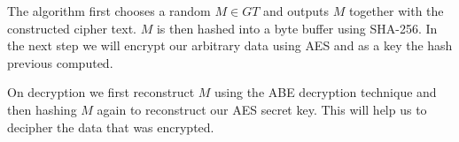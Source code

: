The algorithm first chooses a random $M \in GT$ and outputs $M$ together with the constructed cipher text. $M$ is then hashed into a byte buffer using \ac{SHA}-256. In the next step we will encrypt our arbitrary data using \ac{AES} and as a key the hash previous computed. 

On decryption we first reconstruct $M$ using the ABE decryption technique and then hashing $M$ again to reconstruct our AES secret key. This will help us to decipher the data that was encrypted. 
